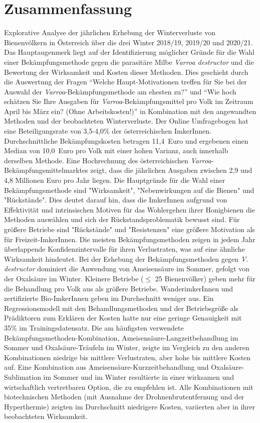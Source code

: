 \chapter*{Zusammenfassung}
\label{sec:Zusammenfassung}
\vspace*{-14mm}

Explorative Analyse der jährlichen Erhebung der Winterverluste von Bienenvölkern in Österreich über die drei Winter 2018/19, 2019/20 und 2020/21. Das Hauptaugenmerk liegt auf der Identifizierung möglicher Gründe für die Wahl einer Bekämpfungsmethode gegen die parasitäre Milbe \textit{Varroa destructor} und die Bewertung der Wirksamkeit und Kosten dieser Methoden. Dies geschieht durch die Auswertung der Fragen \enquote{Welche Haupt-Motivationen treffen für Sie bei der Auswahl der \textit{Varroa}-Bekämpfungsmethode am ehesten zu?} und \enquote{Wie hoch schätzen Sie Ihre Ausgaben für \textit{Varroa}-Bekämpfungsmittel pro Volk im Zeitraum April bis März ein? (Ohne Arbeitskosten!)} in Kombination mit den angewandten Methoden und der beobachteten Winterverluste. Der Online Umfragebogen hat eine Beteiligungsrate von 3,5-4,0\% der österreichischen ImkerInnen. Durchschnittliche Bekämpfungskosten betragen 11,4~Euro und ergebenen einen Median von 10,0~Euro pro Volk mit einer hohen Varianz, auch innerhalb derselben Methode. Eine Hochrechnung des österreichischen \textit{Varroa}-Bekämpfungsmittelmarktes zeigt, dass die jährlichen Ausgaben zwischen 2,9 und 4,8 Millionen Euro pro Jahr liegen. Die Hauptgründe für die Wahl einer Bekämpfungsmethode sind "Wirksamkeit", "Nebenwirkungen auf die Bienen" und "Rückstände". Dies deutet darauf hin, dass die ImkerInnen aufgrund von Effektivität und intrinsischen Motiven für das Wohlergehen ihrer Honigbienen die Methoden auswählen und sich der Rückstandsproblematik bewusst sind. Für größere Betriebe sind "Rückstände" und "Resistenzen" eine größere Motivation als für Freizeit-ImkerInnen. Die meisten Bekämpfungsmethoden zeigen in jedem Jahr überlappende Konfidenzintervalle für ihren Verlustraten, was auf eine ähnliche Wirksamkeit hindeutet. Bei der Erhebung der Bekämpfungsmethoden gegen \textit{V. destructor} dominiert die Anwendung von Ameisensäure im Sommer, gefolgt von der Oxalsäure im Winter. Kleinere Betriebe ($\leq$ 25 Bienenvölker) geben mehr für die Behandlung pro Volk aus als größere Betriebe. WanderimkerInnen und zertifizierte Bio-ImkerInnen geben im Durchschnitt weniger aus. Ein Regressionsmodell mit den Behandlungsmethoden und der Betriebsgröße als Prädiktoren zum Erklären der Kosten hatte nur eine geringe Genauigkeit mit 35\% im Trainingsdatensatz. Die am häufigsten verwendete Bekämpfungsmethoden-Kombination, Ameisensäure-Langzeitbehandlung im Sommer und Oxalsäure-Träufeln im Winter, zeigte im Vergleich zu den anderen Kombinationen niedrige bis mittlere Verlustraten, aber hohe bis mittlere Kosten auf. Eine Kombination aus Ameisensäure-Kurzzeitbehandlung und Oxalsäure-Sublimation im Sommer und im Winter resultierte in einer wirksamen und wirtschaftlich vertretbaren Option, die zu empfehlen ist. Alle Kombinationen mit biotechnischen Methoden (mit Ausnahme der Drohnenbrutentfernung und der Hyperthermie) zeigten im Durchschnitt niedrigere Kosten, variierten aber in ihrer beobachteten Wirksamkeit.
